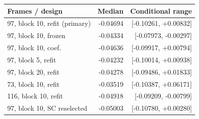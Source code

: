 \begin{tabular}{lrr}
\toprule
Frames / design & Median & Conditional range \\
\midrule
97, block 10, refit (primary) & -0.04694 & [-0.10261, +0.00832] \\
97, block 10, frozen & -0.04334 & [-0.07973, -0.00297] \\
97, block 10, coef. & -0.04636 & [-0.09917, +0.00794] \\
97, block 5, refit & -0.04232 & [-0.10014, +0.00938] \\
97, block 20, refit & -0.04278 & [-0.09486, +0.01833] \\
73, block 10, refit & -0.03519 & [-0.10387, +0.06171] \\
116, block 10, refit & -0.04918 & [-0.09209, -0.00799] \\
97, block 10, SC reselected & -0.05003 & [-0.10780, +0.00280] \\
\bottomrule
\end{tabular}
